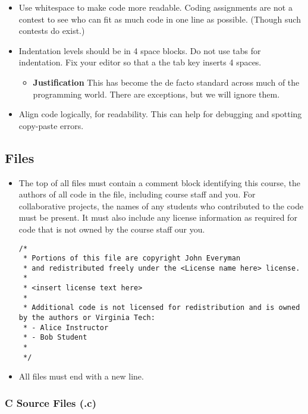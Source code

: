\begin{itemize}
    \item Use whitespace to make code more readable.  Coding assignments are not a contest to see who can fit as much code in one line as possible.  (Though such contests do exist.)
    \item Indentation levels should be in 4 space blocks.  Do not use tabs for indentation.  Fix your editor so that a the tab key inserts 4 spaces.
        \begin{itemize}
            \item \textbf{Justification} This has become the de facto standard across much of the programming world.  There are exceptions, but we will ignore them.
        \end{itemize}
    \item Align code logically, for readability.  This can help for debugging and spotting copy-paste errors.
\end{itemize}

\subsection{Files}

\begin{itemize}

    \item The top of all files must contain a comment block identifying this course, the authors of all code in the file, including course staff and you.  For collaborative projects, the names of any students who contributed to the code must be present.  It must also include any license information as required for code that is not owned by the course staff our you.
        \begin{verbatim}
/*
 * Portions of this file are copyright John Everyman
 * and redistributed freely under the <License name here> license.
 *
 * <insert license text here>  
 * 
 * Additional code is not licensed for redistribution and is owned by the authors or Virginia Tech:
 * - Alice Instructor
 * - Bob Student
 *
 */
        \end{verbatim}

    \item All files must end with a new line.

\end{itemize}

\subsubsection{C Source Files (.c)}

